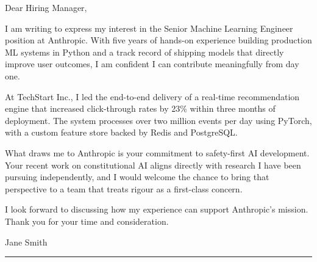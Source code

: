 \documentclass{cfcl}
\begin{document}
\smallskip
{}      %
\smallskip
{}
\smallskip
{}
\clheadrule



\opening{Dear Hiring Manager,}                                %

I am writing to express my interest in the Senior Machine Learning Engineer
position at Anthropic. With five years of hands-on experience building
production ML systems in Python and a track record of shipping models that
directly improve user outcomes, I am confident I can contribute meaningfully
from day one.

At TechStart Inc., I led the end-to-end delivery of a real-time recommendation
engine that increased click-through rates by 23\% within three months of
deployment. The system processes over two million events per day using PyTorch,
with a custom feature store backed by Redis and PostgreSQL.

What draws me to Anthropic is your commitment to safety-first AI development.
Your recent work on constitutional AI aligns directly with research I have
been pursuing independently, and I would welcome the chance to bring that
perspective to a team that treats rigour as a first-class concern.

\closing{%
  I look forward to discussing how my experience can support Anthropic's mission.
  Thank you for your time and consideration.%
}{Jane Smith}                                      %

\vfill
\noindent\textcolor{accent}{\rule{\linewidth}{1.2pt}}
\end{document}
